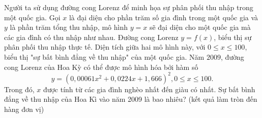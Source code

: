 \begin{bt}%
	Người ta sử dụng đường cong Lorenz để minh họa sự phân phối thu  nhập trong một quốc gia. Gọi $x$ là đại diện cho phần trăm số gia đình trong một quốc gia và $y$ là phần trăm tổng thu nhập, mô hình $y=x$ sẽ đại diện cho một quốc gia mà các gia đình có thu nhập như nhau. Đường cong Lorenz $y=f(x)$, biểu thị sự phân phối thu nhập thực tế. Diện tích giữa hai mô hình này, với $0 \le x \le 100$, biểu thị "sự bất bình đẳng về thu nhập" của một quốc gia. Năm $2009$, đường cong Lorenz của Hoa Kỳ có thể được mô hình hóa bởi hàm số
	$$ y=(0{,}00061x^2+0{,}0224x+1{,}666)^2, 0 \le x \le 100.  $$
	Trong đó, $x$ được tính từ các gia đình nghèo nhất đến giàu có nhất. Sự bất bình đẳng về thu nhập của Hoa Kì vào năm 2009 là bao nhiêu? (kết  quả làm tròn đến hàng đơn vị)
\end{bt}

